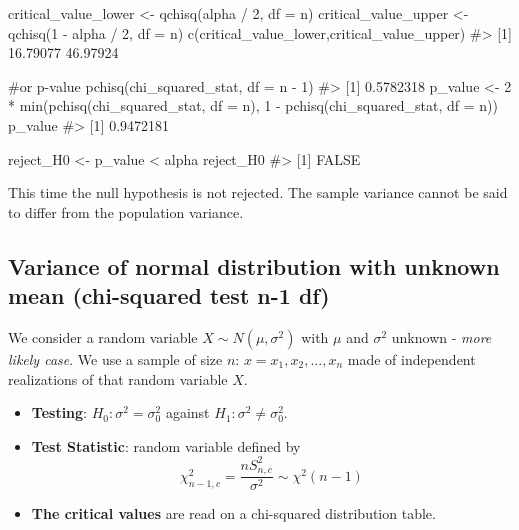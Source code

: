 \documentclass[
  letterpaper,
  DIV=11,
  numbers=noendperiod]{scrreprt}
\newenvironment{Shaded}{\begin{snugshade}}{\end{snugshade}}
\newcommand{\AttributeTok}[1]{\textcolor[rgb]{0.40,0.45,0.13}{#1}}
\newcommand{\CommentTok}[1]{\textcolor[rgb]{0.37,0.37,0.37}{#1}}
\newcommand{\DecValTok}[1]{\textcolor[rgb]{0.68,0.00,0.00}{#1}}
\newcommand{\FunctionTok}[1]{\textcolor[rgb]{0.28,0.35,0.67}{#1}}
\newcommand{\NormalTok}[1]{\textcolor[rgb]{0.00,0.23,0.31}{#1}}
\newcommand{\OtherTok}[1]{\textcolor[rgb]{0.00,0.23,0.31}{#1}}
\newcommand{\SpecialCharTok}[1]{\textcolor[rgb]{0.37,0.37,0.37}{#1}}
\begin{document}
\begin{Shaded}
\begin{Highlighting}[]
\NormalTok{critical\_value\_lower }\OtherTok{\textless{}{-}} \FunctionTok{qchisq}\NormalTok{(alpha }\SpecialCharTok{/} \DecValTok{2}\NormalTok{, }\AttributeTok{df =}\NormalTok{ n)}
\NormalTok{critical\_value\_upper }\OtherTok{\textless{}{-}} \FunctionTok{qchisq}\NormalTok{(}\DecValTok{1} \SpecialCharTok{{-}}\NormalTok{ alpha }\SpecialCharTok{/} \DecValTok{2}\NormalTok{, }\AttributeTok{df =}\NormalTok{ n)}
\FunctionTok{c}\NormalTok{(critical\_value\_lower,critical\_value\_upper)}
\CommentTok{\#\textgreater{} [1] 16.79077 46.97924}

\CommentTok{\#or p{-}value}
\FunctionTok{pchisq}\NormalTok{(chi\_squared\_stat, }\AttributeTok{df =}\NormalTok{ n }\SpecialCharTok{{-}} \DecValTok{1}\NormalTok{)}
\CommentTok{\#\textgreater{} [1] 0.5782318}
\NormalTok{p\_value }\OtherTok{\textless{}{-}} \DecValTok{2} \SpecialCharTok{*} \FunctionTok{min}\NormalTok{(}\FunctionTok{pchisq}\NormalTok{(chi\_squared\_stat, }\AttributeTok{df =}\NormalTok{ n), }\DecValTok{1} \SpecialCharTok{{-}} \FunctionTok{pchisq}\NormalTok{(chi\_squared\_stat, }\AttributeTok{df =}\NormalTok{ n))}
\NormalTok{p\_value}
\CommentTok{\#\textgreater{} [1] 0.9472181}

\NormalTok{reject\_H0 }\OtherTok{\textless{}{-}}\NormalTok{ p\_value }\SpecialCharTok{\textless{}}\NormalTok{ alpha}
\NormalTok{reject\_H0}
\CommentTok{\#\textgreater{} [1] FALSE}
\end{Highlighting}
\end{Shaded}

This time the null hypothesis is not rejected. The sample variance
cannot be said to differ from the population variance.

\subsection{Variance of normal distribution with unknown mean
(chi-squared test n-1
df)}\label{variance-of-normal-distribution-with-unknown-mean-chi-squared-test-n-1-df}

We consider a random variable \(X \sim N(\mu, \sigma^2)\) with \(\mu\)
and \(\sigma^2\) unknown - \emph{more likely case}. We use a sample of
size \(n\): \(x = {x_1, x_2,..., x_n}\) made of independent realizations
of that random variable \(X\).

\begin{itemize}
\item
  \textbf{Testing}: \(H_0: \sigma^2 = \sigma^2_0\) against
  \(H_1: \sigma^2 \neq \sigma^2_0\).
\item
  \textbf{Test Statistic}: random variable defined by
  \[\chi^2_{n-1,c} = \dfrac{n S^2_{n,c}}{\sigma^2} \sim \chi^2(n-1)\]
\item
  \textbf{The critical values} are read on a chi-squared distribution
  table.
\end{itemize}
\end{document}
